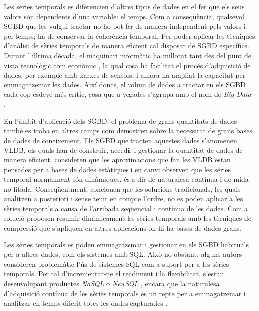 Les sèries temporals es diferencien d'altres tipus de dades en el fet
que els seus valors són dependents d'una variable: el temps. Com a
conseqüència, qualsevol \gls{SGBD} que les vulgui tractar no ho pot
fer de manera independent pels valors i pel temps; ha de conservar la
coherència temporal.  
%
Per poder aplicar les tècniques d'anàlisi de sèries temporals de
manera eficient cal disposar de \gls{SGBD} específics.  Durant
l'última dècada, el maquinari informàtic ha millorat tant des del punt
de vista tecnològic com econòmic \parencite{deligiannakis07}, la qual
cosa ha facilitat el procés d'adquisició de dades, per exemple amb
xarxes de sensors, i alhora ha ampliat la capacitat per emmagatzemar
les dades.  Així doncs, el volum de dades a tractar en els \gls{SGBD}
cada cop esdevé més crític, cosa que a vegades s'agrupa amb el nom de
\emph{Big Data} \parencite{jagadish14:bigdata}.



 
En l'àmbit d'aplicació dels \gls{SGBD}, el problema de grans
quantitats de dades també es troba en altres camps com demostren
\textcite{mylopoulos96} sobre la necessitat de grans bases de dades de
coneixement. Els \gls{SGBD} que tracten aquestes dades s'anomenen
\gls{VLDB}, els quals han de construir, accedir i gestionar la
quantitat de dades de manera eficient.
%
\textcite{ogras06} consideren que les aproximacions que fan les
\gls{VLDB} estan pensades per a bases de dades estàtiques i en canvi
observen que les sèries temporal normalment són dinàmiques, és a dir
de naturalesa contínua i de mida no fitada. Conseqüentment, conclouen
que les solucions tradicionals, les quals analitzen a posteriori i
sense tenir en compte l'ordre, no es poden aplicar a les sèries
temporals a causa de l'arribada seqüencial i contínua de les dades.
Com a solució proposen resumir dinàmicament les sèries temporals amb
les tècniques de compressió que s'apliquen en altres aplicacions on hi
ha bases de dades grans.



Les sèries temporals es poden emmagatzemar i gestionar en els
\gls{SGBD} habituals per a altres dades, com els sistemes amb
\gls{SQL}.  Això no obstant, alguns
autors \parencite{dreyer94,schmidt95,stonebraker09:scidb,zhang11}
consideren problemàtic l'ús de sistemes \gls{SQL} com a suport per a
les sèries temporals. Per tal d'incrementar-ne el rendiment i la
flexibilitat, s'estan desenvolupant productes \emph{NoSQL} o
\emph{NewSQL} \parencite{atzeni13:relational_model_dead,stonebraker10,stonebraker09:scidb,zhang11},
encara que la naturalesa d'adquisició contínua de les sèries temporals
és un repte per a emmagatzemar i analitzar en temps diferit totes les
dades capturades \parencite{keogh97}.



